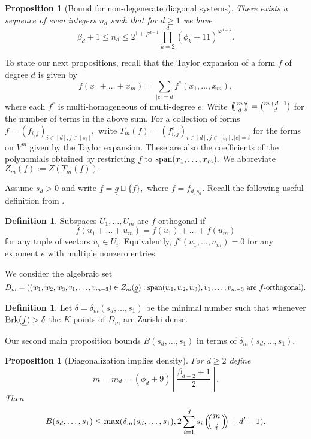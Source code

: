 \documentclass[12pt]{amsart}
\let\ul\underline
\newtheorem{proposition}[theorem]{Proposition}
\theoremstyle{definition}
\newtheorem{definition}[theorem]{Definition}
\def\multiset#1#2{\ensuremath{\left(\kern-.3em\left(\genfrac{}{}{0pt}{}{#1}{#2}\right)\kern-.3em\right)}}
\renewcommand{\sp}{\textnormal{span}}
\newcommand{\brk}{\textnormal{Brk}}
\let\ul\underline
\begin{document}
\begin{proposition}[Bound for non-degenerate diagonal systems]\label{prop:beta-bound}
    There exists a sequence of even integers $n_d$ such that for $d\ge 1$ we have
    \[
    \beta_d+1 \le n_d \le  2^{1+\varphi^{d-1}}\prod_{k=2}^{d} (\phi_k+11) ^{\varphi^{d-k}}.
    \]
\end{proposition}

To state our next propositions, recall that the Taylor expansion of a form $f$ of degree $d$ is given by
\[
f(x_1+\ldots+x_m) = \sum_{|e| = d} f^e(x_1,\ldots,x_m),
\]
where each $f^e$ is multi-homogeneous of multi-degree $e.$ Write $\multiset{m}{d} = \binom{m+d-1}{d}$ for the number of terms in the above sum. For a collection of forms $\ul{f} = (f_{i,j})_{i\in [d],j\in [s_i]},$ write $T_m(\ul{f}) = (f_{i,j}^e)_{i\in [d],j\in [s_i],|e|=i}$ for the forms on $V^m$ given by the Taylor expansion. These are also the coefficients of the polynomials obtained by restricting $\ul{f}$ to $\sp(x_1,\ldots,x_m).$ We abbreviate $Z_m(\ul{f}) := Z(T_m(\ul{f})).$





Assume $s_d>0$ and write $\ul{f} = \ul{g} \sqcup \{f\},$ where $f = f_{d,s_d}.$ Recall the following useful definition from \cite{BDS}.

\begin{definition}
    Subspaces $U_1,\ldots,U_m$ are $f$-orthogonal if
    \[
    f(u_1+\ldots+u_m) = f(u_1)+\ldots+f(u_m)
    \]
    for any tuple of vectors $u_i\in U_i.$ Equivalently, $f^e(u_1,\ldots,u_m) = 0$ for any exponent $e$ with multiple nonzero entries.  
\end{definition}


We consider the algebraic set 
\[
D_m = ((w_1,w_2,w_3,v_1,\ldots,v_{m-3})\in Z_m(\ul{g}): \sp(w_1,w_2,w_3),v_1,\ldots,v_{m-3} \textnormal{ are } f\textnormal{-orthogonal}).
\]


\begin{definition}
   Let $\delta = \delta_m(s_d,\ldots,s_1)$ be the minimal number such that whenever $\brk(\ul{f}) > \delta$ the $K$-points of $D_m$ are Zariski dense. 
\end{definition}

Our second main proposition bounds $B(s_d,\ldots,s_1)$ in terms of $\delta_m(s_d,\ldots,s_1).$

\begin{proposition}[Diagonalization implies density]\label{prop:diag-to-good}
    For $d\ge 2$ define
    \[
    m = m_d = (\phi_d+9)\left\lceil \frac{\beta_{d-2}+1}{2} \right\rceil.
    \]
    Then 
    $$B(s_d,\ldots,s_1) \le \max(\delta_m(s_d,\ldots,s_1), 2 \sum_{i=1}^d s_i \multiset{m}{i}+d'-1).$$
\end{proposition}
\end{document}
